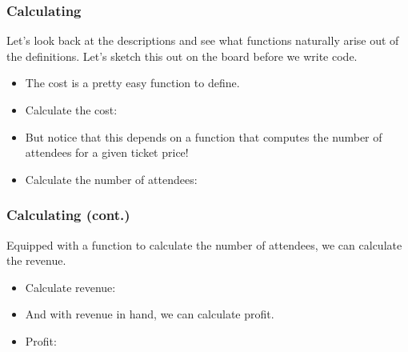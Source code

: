 \documentclass{beamer}
\begin{document}

\begin{frame}
  \frametitle{Calculating}
  Let's look back at the descriptions and see what functions naturally arise
  out of the definitions. Let's sketch this out on the board before we write code.
  \begin{itemize}
  \item<2-> The cost is a pretty easy function to define.
  \item<3-> Calculate the cost: \cost
  \item<4-> But notice that this depends on a function that computes the number
    of attendees for a given ticket price!
  \item<5-> Calculate the number of attendees: \attendees    
  \end{itemize}
\end{frame}



\begin{frame}
  \frametitle{Calculating (cont.)}
  Equipped with a function to calculate the number of attendees,
  we can calculate the revenue.
  \begin{itemize}
  \item<2-> Calculate revenue: \revenue
  \item<3-> And with revenue in hand, we can calculate profit.
  \item<4-> Profit: \profit    
  \end{itemize}
\end{frame}
\end{document}
